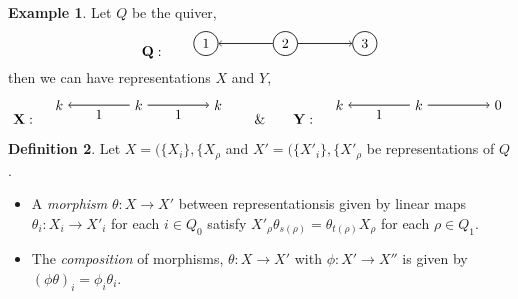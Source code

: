 \documentclass[11.5pt, twoside, a4paper, titlepage]{report}
\theoremstyle{definition}
\newtheorem{mydef}{Definition}[section]
\newtheorem{eg}[mydef]{Example}
\theoremstyle{plain}
\begin{document}
\begin{eg} \label{repseg}
Let $Q$ be the quiver, 
\begin{equation*}
\mathbf{Q}: \qquad
\begin{tikzpicture}[->,-latex, auto, every path/.style={->, semithick}, main node/.style={draw, circle}]
\node	[main node]		(1) at (0,0)		{1};
\node [main node]		(2) at (2,0)		{2};
\node [main node]		(3) at (4,0)		{3};

\draw (2) edge (1);
\draw (2) edge (3);
\end{tikzpicture}
\end{equation*}
then we can have representations $X$ and $Y$, 
\begin{equation*}
\mathbf{X}: \quad
\begin{tikzpicture}[->,-latex, auto, every path/.style={->, semithick}, main node/.style={draw, circle}]
\node	[]		(1) at (0,0)		{$k$};
\node []		(2) at (2,0)		{$k$};
\node []		(3) at (4,0)		{$k$};

\draw (2) edge node [auto, swap] {$$} node [auto] {1} (1);
\draw (2) edge node [auto] {$$} node [auto, swap] {1} (3);
\end{tikzpicture}
\qquad \& \qquad
\mathbf{Y}: \quad
\begin{tikzpicture}[->,-latex, auto, every path/.style={->, semithick}, main node/.style={draw, circle}]
\node	[]		(1) at (0,0)		{$k$};
\node []		(2) at (2,0)		{$k$};
\node []		(3) at (4,0)		{$0$};

\draw (2) edge node [auto, swap] {$$} node [auto] {1} (1);
\draw (2) edge node [auto] {$$} (3);
\end{tikzpicture}
\end{equation*}
\end{eg}

\begin{mydef}
Let $X=(\{X_i\}, \{X_{\rho}$ and $X'=(\{X'_i\}, \{X'_{\rho}$ be representations of $Q$. 
\begin{itemize}
\item A \emph{morphism} $\theta: X \to X'$ between representationsis given by linear maps $\theta_i:X_i \to X'_i$ for each $i\in Q_0$ satisfy $X'_{\rho}\theta _{s(\rho)} = \theta_{t(\rho)}X_{\rho}$ for each $\rho \in Q_1$. 
\item The \emph{composition} of morphisms, $\theta: X \to X'$ with $\phi: X' \to X''$ is given by $(\phi \theta)_i=\phi_i \theta_i$.
\end{itemize}
\end{mydef}
\end{document}
